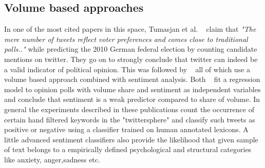 \subsection{Volume based approaches}
In one of the most cited papers in this space, Tumasjan et al. ~\cite{tumasjan2010predicting} claim that \emph{ "The mere number of tweets reflect voter preferences and comes close to  traditional polls.."} while predicting  the 2010 German federal election by counting candidate mentions on twitter. They go on to strongly conclude that twitter can indeed be a valid indicator of political opinion. This was followed by ~\cite{o2010tweets,saez2011total,bermingham2011using,demartini2011analyzing} all of which use a volume based approach combined with sentiment analysis. Both ~\cite{o2010tweets,bermingham2011using} fit a regression model to opinion polls with volume share and sentiment as independent variables and conclude that sentiment is a weak predictor compared to share of volume. In general the experiments described in these publications count the occurrence of certain hand filtered keywords in the "twittersphere" and classify such tweets as positive or negative using a classifier trained on human annotated lexicons. A little advanced sentiment classifiers also provide the likelihood that given sample of text belongs to a empirically defined psychological and structural categories like anxiety, anger,sadness etc. 
